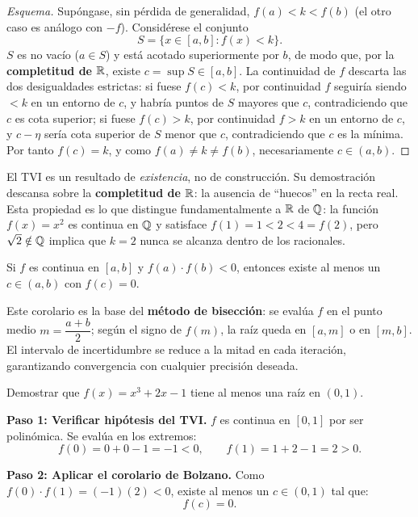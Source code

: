 \begin{proof}[Esquema]
Supóngase, sin pérdida de generalidad, $f(a)<k<f(b)$ (el otro caso es
análogo con $-f$). Considérese el conjunto
\[
  S=\{x\in[a,b]:f(x)<k\}.
\]
$S$ es no vacío ($a\in S$) y está acotado superiormente por $b$, de modo que,
por la \textbf{completitud de ${\mathbb R}$}, existe $c=\sup S\in[a,b]$. La continuidad
de $f$ descarta las dos desigualdades estrictas: si fuese $f(c)<k$, por
continuidad $f$ seguiría siendo $<k$ en un entorno de $c$, y habría puntos de
$S$ mayores que $c$, contradiciendo que $c$ es cota superior; si fuese
$f(c)>k$, por continuidad $f>k$ en un entorno de $c$, y $c-\eta$ sería cota
superior de $S$ menor que $c$, contradiciendo que $c$ es la mínima. Por tanto
$f(c)=k$, y como $f(a)\neq k\neq f(b)$, necesariamente $c\in(a,b)$.
\end{proof}

El TVI es un resultado de \emph{existencia}, no de construcción. Su
demostración descansa sobre la \textbf{completitud de ${\mathbb R}$}: la ausencia de
``huecos'' en la recta real. Esta propiedad es lo que distingue
fundamentalmente a ${\mathbb R}$ de ${\mathbb Q}$: la función $f(x)=x^2$ es continua en ${\mathbb Q}$
y satisface $f(1)=1<2<4=f(2)$, pero $\sqrt{2}\notin{\mathbb Q}$ implica que $k=2$
nunca se alcanza dentro de los racionales.

\begin{coro}
Si $f$ es continua en $[a,b]$ y $f(a)\cdot f(b)<0$, entonces existe al
menos un $c\in(a,b)$ con $f(c)=0$.
\end{coro}

Este corolario es la base del \textbf{método de bisección}: se evalúa $f$ en
el punto medio $m=\dfrac{a+b}{2}$; según el signo de $f(m)$, la raíz queda
en $[a,m]$ o en $[m,b]$. El intervalo de incertidumbre se reduce a la mitad
en cada iteración, garantizando convergencia con cualquier precisión deseada.

\begin{example}
Demostrar que $f(x)=x^3+2x-1$ tiene al menos una raíz en $(0,1)$.

\begin{myproof}
\textbf{Paso 1: Verificar hipótesis del TVI.} $f$ es continua en $[0,1]$ por ser polinómica. Se evalúa en los extremos:
\[
  f(0) = 0+0-1 = -1 < 0, \qquad f(1) = 1+2-1 = 2 > 0.
\]

\textbf{Paso 2: Aplicar el corolario de Bolzano.} Como $f(0)\cdot f(1)=(-1)(2)<0$, existe al menos un $c\in(0,1)$ tal que:
\[
  \boxed{f(c) = 0.}
\]
\end{myproof}
\end{example}

